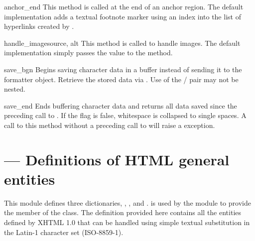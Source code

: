 \begin{methoddesc}[HTMLParser]{anchor_end}{}
This method is called at the end of an anchor region.  The default
implementation adds a textual footnote marker using an index into the
list of hyperlinks created by .
\end{methoddesc}

\begin{methoddesc}[HTMLParser]{handle_image}{source, alt}
This method is called to handle images.  The default implementation
simply passes the  value to the 
method.
\end{methoddesc}

\begin{methoddesc}[HTMLParser]{save_bgn}{}
Begins saving character data in a buffer instead of sending it to the
formatter object.  Retrieve the stored data via .
Use of the  /  pair may not be
nested.
\end{methoddesc}

\begin{methoddesc}[HTMLParser]{save_end}{}
Ends buffering character data and returns all data saved since the
preceding call to .  If the  flag is
false, whitespace is collapsed to single spaces.  A call to this
method without a preceding call to  will raise a
 exception.
\end{methoddesc}



\section{ ---
         Definitions of HTML general entities}


This module defines three dictionaries, ,
, and .  is
used by the  module to provide the
 member of the  class.  The
definition provided here contains all the entities defined by XHTML 1.0 
that can be handled using simple textual substitution in the Latin-1
character set (ISO-8859-1).


